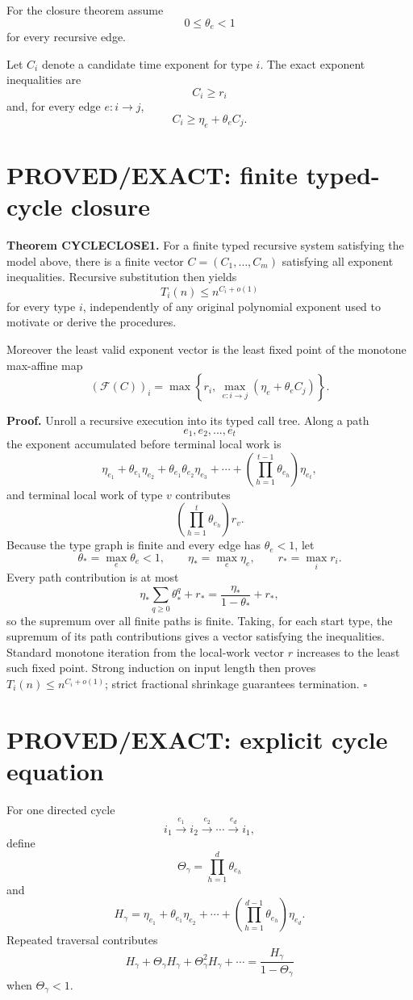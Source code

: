 \documentclass[11pt]{article}
\begin{document}
For the closure theorem assume
\[
0\le \theta_e<1
\]
for every recursive edge.

Let \(C_i\) denote a candidate time exponent for type \(i\). The exact exponent inequalities are
\[
C_i\ge r_i
\]
and, for every edge \(e:i\to j\),
\[
C_i\ge \eta_e+\theta_e C_j.
\]

\section*{PROVED/EXACT: finite typed-cycle closure}
\textbf{Theorem CYCLECLOSE1.}
For a finite typed recursive system satisfying the model above, there is a finite vector \(C=(C_1,\ldots,C_m)\) satisfying all exponent inequalities. Recursive substitution then yields
\[
T_i(n)\le n^{C_i+o(1)}
\]
for every type \(i\), independently of any original polynomial exponent used to motivate or derive the procedures.

Moreover the least valid exponent vector is the least fixed point of the monotone max-affine map
\[
(\mathcal F(C))_i=
\max\left\{
r_i,\,
\max_{e:i\to j}(\eta_e+\theta_e C_j)
\right\}.
\]

\textbf{Proof.}
Unroll a recursive execution into its typed call tree. Along a path
\[
e_1,e_2,\ldots,e_t
\]
the exponent accumulated before terminal local work is
\[
\eta_{e_1}
+\theta_{e_1}\eta_{e_2}
+\theta_{e_1}\theta_{e_2}\eta_{e_3}
+\cdots
+\left(\prod_{h=1}^{t-1}\theta_{e_h}\right)\eta_{e_t},
\]
and terminal local work of type \(v\) contributes
\[
\left(\prod_{h=1}^{t}\theta_{e_h}\right)r_v.
\]
Because the type graph is finite and every edge has \(\theta_e<1\), let
\[
\theta_*=\max_e\theta_e<1,
\qquad
\eta_*=\max_e\eta_e,
\qquad
r_*=\max_i r_i.
\]
Every path contribution is at most
\[
\eta_*\sum_{q\ge0}\theta_*^q+r_*
=
\frac{\eta_*}{1-\theta_*}+r_*,
\]
so the supremum over all finite paths is finite. Taking, for each start type, the supremum of its path contributions gives a vector satisfying the inequalities. Standard monotone iteration from the local-work vector \(r\) increases to the least such fixed point. Strong induction on input length then proves \(T_i(n)\le n^{C_i+o(1)}\); strict fractional shrinkage guarantees termination. \(\square\)

\section*{PROVED/EXACT: explicit cycle equation}
For one directed cycle
\[
i_1\xrightarrow{e_1}i_2\xrightarrow{e_2}\cdots
\xrightarrow{e_d}i_1,
\]
define
\[
\Theta_\gamma=\prod_{h=1}^{d}\theta_{e_h}
\]
and
\[
H_\gamma=
\eta_{e_1}
+\theta_{e_1}\eta_{e_2}
+\cdots+
\left(\prod_{h=1}^{d-1}\theta_{e_h}\right)\eta_{e_d}.
\]
Repeated traversal contributes
\[
H_\gamma+\Theta_\gamma H_\gamma+\Theta_\gamma^2H_\gamma+\cdots
=
\boxed{\frac{H_\gamma}{1-\Theta_\gamma}}
\]
when \(\Theta_\gamma<1\).
\end{document}
